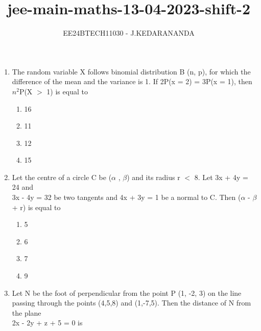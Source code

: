 \documentclass[journal]{IEEEtran}
\renewcommand{\thefigure}{\theenumi}
\renewcommand{\thetable}{\theenumi}
\numberwithin{equation}{enumi}
\numberwithin{figure}{enumi}
\renewcommand{\thetable}{\theenumi}
\begin{document}

\vspace{3cm}

\title{jee-main-maths-13-04-2023-shift-2}
\author{EE24BTECH11030 - J.KEDARANANDA}
{\let\newpage\relax\maketitle}
\renewcommand{\thefigure}{\theenumi}
\renewcommand{\thetable}{\theenumi}
\begin{enumerate}
    \item The random variable X follows binomial distribution B (n, p), for which the difference of the mean and the variance is 1. If 2P(x = 2) = 3P(x = 1), then \\$n^2$P(X $>$ 1) is equal to  \\ 
    \begin{multicols}{4}
    \begin{enumerate}
        \item 16
        \item 11
        \item 12
        \item 15
    \end{enumerate}
    \end{multicols}
    \bigskip
    \item Let the centre of a circle C be ($\alpha$ , $\beta$) and its radius r $<$ 8. Let 3x + 4y = 24 and\\ 3x - 4y = 32 be two tangents and 4x + 3y = 1 be a normal to C. Then ($\alpha$ - $\beta$ + r) is equal to  \\
    \begin{multicols}{4}
    \begin{enumerate}
        \item 5
        \item 6
        \item 7
        \item 9
    \end{enumerate} 
    \end{multicols}
    \bigskip
    \item Let N be the foot of perpendicular from the point P (1, -2, 3) on the line passing through the points (4,5,8) and (1,-7,5). Then the distance of N from the plane\\ 2x - 2y + z + 5 = 0 is  \\

\end{enumerate}
\end{document}
